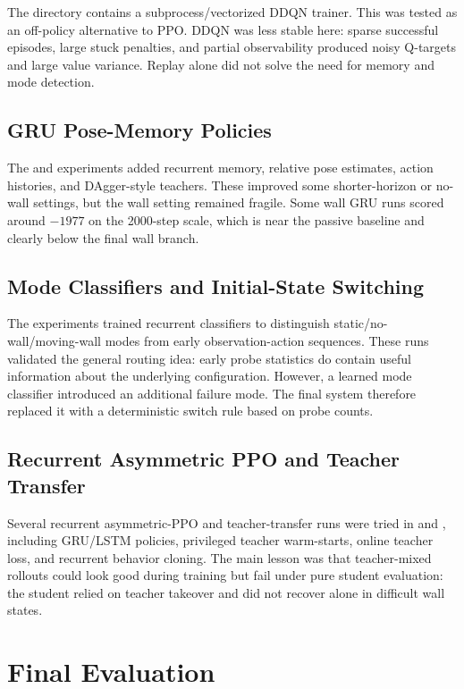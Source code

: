 \documentclass[11pt]{article}
\begin{document}
The  directory contains a subprocess/vectorized DDQN trainer.
This was tested as an off-policy alternative to PPO. DDQN was less stable here: sparse
successful episodes, large stuck penalties, and partial observability produced noisy
Q-targets and large value variance. Replay alone did not solve the need for memory and
mode detection.

\subsection{GRU Pose-Memory Policies}

The  and  experiments added recurrent memory,
relative pose estimates, action histories, and DAgger-style teachers. These improved
some shorter-horizon or no-wall settings, but the wall setting remained fragile. Some
wall GRU runs scored around \(-1977\) on the 2000-step scale, which is near the passive
baseline and clearly below the final wall branch.

\subsection{Mode Classifiers and Initial-State Switching}

The  experiments trained recurrent classifiers to distinguish
static/no-wall/moving-wall modes from early observation-action sequences. These runs
validated the general routing idea: early probe statistics do contain useful information
about the underlying configuration. However, a learned mode classifier introduced an
additional failure mode. The final system therefore replaced it with a deterministic
switch rule based on probe counts.

\subsection{Recurrent Asymmetric PPO and Teacher Transfer}

Several recurrent asymmetric-PPO and teacher-transfer runs were tried in
 and , including GRU/LSTM policies,
privileged teacher warm-starts, online teacher loss, and recurrent behavior cloning. The
main lesson was that teacher-mixed rollouts could look good during training but fail
under pure student evaluation: the student relied on teacher takeover and did not
recover alone in difficult wall states.

\section{Final Evaluation}
\end{document}
